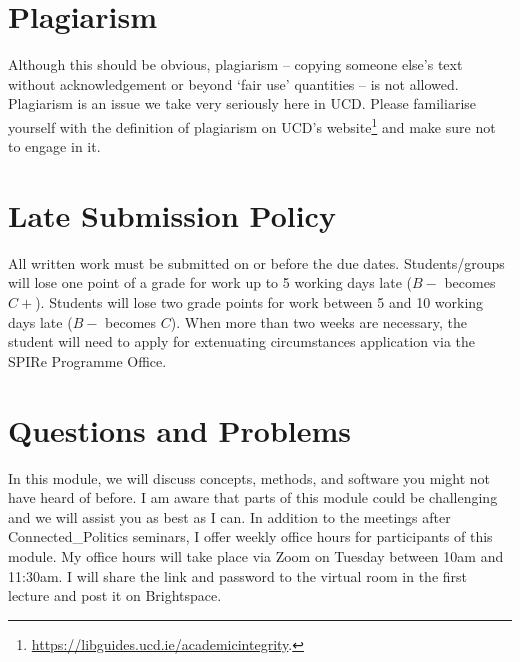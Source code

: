 \documentclass[abstract=on,parskip=full,headings=standardclasses,fontsize=11pt,paper=a4]{scrartcl}
\begin{document}
\section*{Plagiarism}

Although this should be obvious, plagiarism -- copying someone else's text without acknowledgement or beyond `fair use' quantities -- is not allowed. Plagiarism is an issue we take very seriously here in UCD. Please familiarise yourself with the definition of plagiarism on UCD's website\footnote{\url{https://libguides.ucd.ie/academicintegrity}.} and make sure not to engage in it.



\section*{Late Submission Policy}

All written work must be submitted on or before the due dates. Students/groups will lose one point of a grade for work up to 5 working days late ($B-$ becomes $C+$). Students will lose two grade points for work between 5 and 10 working days late ($B-$ becomes $C$). When more than two weeks are necessary, the student will need to apply for extenuating circumstances application via the SPIRe Programme Office.




\section*{Questions and Problems}

In this module, we will discuss concepts, methods, and software you might not have heard of before. I am  aware that parts of this module could be challenging and we will assist you as best as I can. In addition to the meetings after Connected\_Politics seminars, I  offer weekly office hours for  participants of this module. My office hours will take place via Zoom on Tuesday between 10am and 11:30am. I will share the link and password to the virtual room in the first lecture and post it on Brightspace. 
\end{document}
